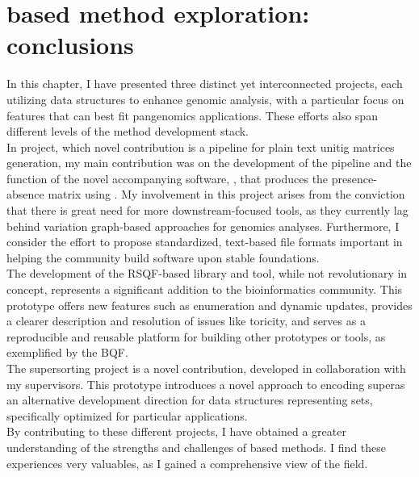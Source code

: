 \section{\kmer based method exploration: conclusions}
In this chapter, I have presented three distinct yet interconnected projects, each utilizing \kmer data structures to enhance genomic analysis, with a particular focus on features that can best fit pangenomics applications. These efforts also span different levels of the method development stack.\\
In \muset project, which novel contribution is a pipeline for plain text unitig matrices generation, my main contribution was on the development of the pipeline and the function of the novel accompanying software, \kmat, that produces the presence-absence matrix using \ggcat. My involvement in this project arises from the conviction that there is great need for more downstream-focused \kmer tools, as they currently lag behind variation graph-based approaches for genomics analyses. Furthermore, I consider the effort to propose standardized, text-based file formats important in helping the community build software upon stable foundations.\\
The development of the RSQF-based library and tool, while not revolutionary in concept, represents a significant addition to the bioinformatics community. This prototype offers new features such as enumeration and dynamic updates, provides a clearer description and resolution of issues like toricity, and serves as a reproducible and reusable platform for building other prototypes or tools, as exemplified by the BQF.\\
The super\kmer sorting project is a novel contribution, developed in collaboration with my supervisors. This prototype introduces a novel approach to encoding super\kmers as an alternative development direction for data structures representing \kmer sets, specifically optimized for particular applications.\\
By contributing to these different projects, I have obtained a greater understanding of the strengths and challenges of \kmer based methods. I find these experiences very valuables, as I gained a comprehensive view of the field.

\printbibliography